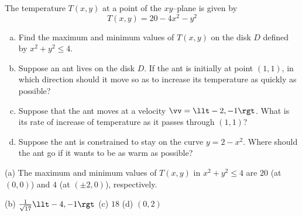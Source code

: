 \begin{question}[M200 2009D] %
The temperature $T(x,y)$ at a point of the $xy$--plane is given by
\begin{equation*}
T(x,y) = 20 - 4x^2 - y^2 
\end{equation*}
\begin{enumerate}[(a)]
\item
Find the maximum and minimum values of $T(x,y)$ on the disk $D$ 
defined by $x^2 + y^2 \le 4$.

\item
Suppose an ant lives on the disk $D$. If the ant is initially at point 
$(1, 1)$, in which direction should it move so as to increase its 
temperature as quickly as possible?


\item
Suppose that the ant moves at a velocity $\vv = \llt -2, -1\rgt$. 
What is its rate of increase of temperature as it passes through $(1, 1)$?

\item 
Suppose the ant is constrained to stay on the curve $y = 2 - x^2$. 
Where should the ant go if it wants to be as warm as possible?

\end{enumerate}
\end{question}

%

\begin{answer}
(a) The maximum and minimum values of $T(x,y)$ in $x^2+y^2\le 4$
     are $20$ (at $(0,0)$) and  $4$ (at $(\pm 2,0)$), respectively.

(b) $\frac{1}{\sqrt{17}}\llt -4,-1\rgt$\qquad
(c) $18$\qquad
(d) $(0,2)$
\end{answer}

